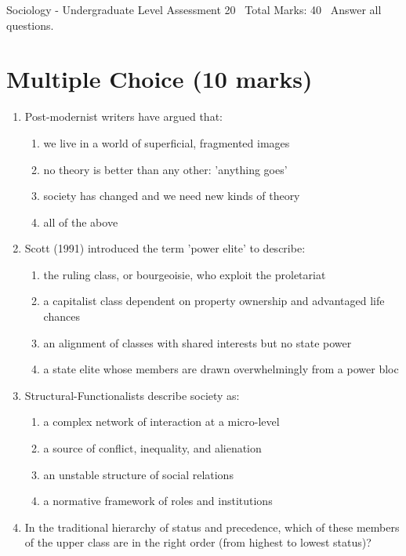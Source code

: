 \documentclass[12pt]{article}
\begin{document}
\begin{center}
Sociology - Undergraduate Level Assessment 20 \
Total Marks: 40 \
Answer all questions.
\end{center}

\section*{Multiple Choice (10 marks)}
\begin{enumerate}[label=\arabic*.]
\item Post-modernist writers have argued that:
\begin{enumerate}[label=(\alph*)]
    \item we live in a world of superficial, fragmented images
    \item no theory is better than any other: 'anything goes'
    \item society has changed and we need new kinds of theory
    \item all of the above
\end{enumerate}
\item Scott (1991) introduced the term 'power elite' to describe:
\begin{enumerate}[label=(\alph*)]
    \item the ruling class, or bourgeoisie, who exploit the proletariat
    \item a capitalist class dependent on property ownership and advantaged life chances
    \item an alignment of classes with shared interests but no state power
    \item a state elite whose members are drawn overwhelmingly from a power bloc
\end{enumerate}
\item Structural-Functionalists describe society as:
\begin{enumerate}[label=(\alph*)]
    \item a complex network of interaction at a micro-level
    \item a source of conflict, inequality, and alienation
    \item an unstable structure of social relations
    \item a normative framework of roles and institutions
\end{enumerate}
\item In the traditional hierarchy of status and precedence, which of these members of the upper class are in the right order (from highest to lowest status)?

\end{enumerate}
\end{document}
